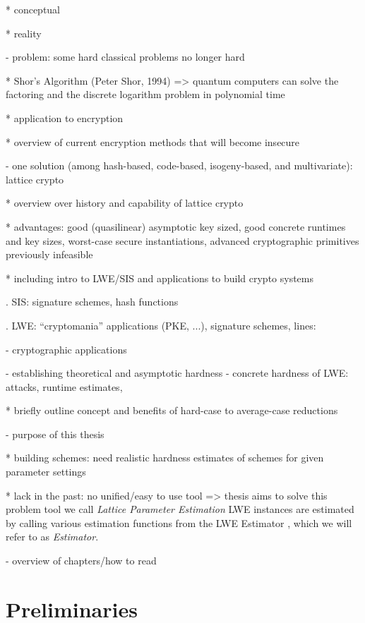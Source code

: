 \documentclass[
  a4paper,  %
  twoside,  %
  bibliography=totoc,
  headsepline,
  cleardoublepage=empty,
  parskip=half,
  draft=false
]{scrbook}
\begin{document}
* conceptual

* reality


- problem: some hard classical problems no longer hard

* Shor's Algorithm (Peter Shor, 1994) %
=> quantum computers can solve the factoring and the discrete logarithm problem in polynomial time

* application to encryption

* overview of current encryption methods that will become insecure


- one solution (among hash-based, code-based, isogeny-based, and multivariate): lattice crypto

* overview over history and capability of lattice crypto

* advantages: good (quasilinear) asymptotic key sized, good concrete runtimes and key sizes, worst-case secure instantiations, advanced cryptographic primitives previously infeasible

* including intro to LWE/SIS and applications to build crypto systems

. SIS: signature schemes, hash functions

. LWE: ``cryptomania'' applications (PKE, ...), signature schemes, lines:

- cryptographic applications

- establishing theoretical and asymptotic hardness \cite{Reg05} %
\cite{BLPRS13, MP13}
- concrete hardness of LWE: attacks, runtime estimates,

* briefly outline concept and benefits of hard-case to average-case reductions


- purpose of this thesis

* building schemes: need realistic hardness estimates of schemes for given parameter settings

* lack in the past: no unified/easy to use tool => thesis aims to solve this problem
tool we call \textit{Lattice Parameter Estimation} %
LWE instances are estimated by calling various estimation functions from the LWE Estimator \cite{APS15}, which we will refer to as \textit{Estimator}.


- overview of chapters/how to read



\chapter{Preliminaries} \label{chap:Preliminaries}
\end{document}
